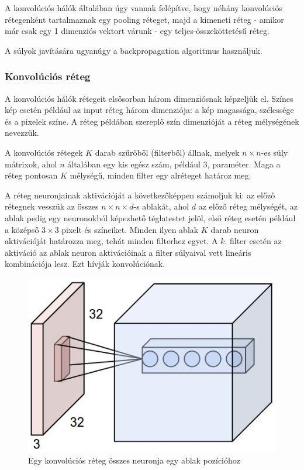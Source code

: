 \documentclass[12pt]{article}
\begin{document}
A konvolúciós hálók általában úgy vannak felépítve, hogy néhány konvolúciós rétegenként tartalmaznak egy pooling réteget, majd a kimeneti réteg - amikor már csak egy 1 dimenziós vektort várunk - egy teljes-összeköttetésű réteg.

A súlyok javítására ugyanúgy a backpropagation algoritmus használjuk.

\subsubsection{Konvolúciós réteg}

A konvolúciós hálók rétegeit elsősorban három dimenziósnak képzeljük el. Színes kép esetén például az input réteg három dimenziója: a kép magassága, szélessége és a pixelek színe. A réteg példában szereplő szín dimenzióját a réteg mélységének nevezzük.

A konvolúciós rétegek $K$ darab szűrőből (filterből) állnak, melyek $n\times n$-es súly mátrixok, ahol $n$ általában egy kis egész szám, például 3, paraméter. Maga a réteg pontosan $K$ mélységű, minden filter egy alréteget határoz meg.

A réteg neuronjainak aktivációját a következőképpen számoljuk ki: az előző rétegnek vesszük az összes $n\times n\times d$-s ablakát, ahol $d$ az előző réteg mélységét, az ablak pedig egy neuronokból képezhető téglatestet jelöl, első réteg esetén például a középső $3\times3$ pixelt és színeiket. Minden ilyen ablak $K$ darab neuron aktivációját határozza meg, tehát minden filterhez egyet. A $k$. filter esetén az aktiváció az ablak neuron aktivációinak a filter súlyaival vett lineáris kombinációja lesz. Ezt hívják konvolúciónak.

\begin{figure}[h!]
\begin{center}
  \includegraphics[width=0.5\linewidth]{depthcol.jpg}
  \caption{Egy konvolúciós réteg összes neuronja egy ablak pozícióhoz}
\end{center}
\end{figure}
\end{document}
